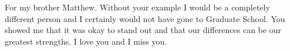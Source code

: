 For my brother Matthew. Without your example I would be a completely different person and I certainly would not have gone to Graduate School. You showed me that it was okay to stand out and that our differences can be our greatest strengths. I love you and I miss you.

